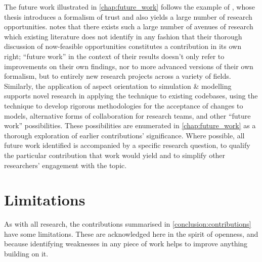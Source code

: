 \begin{description}[style=unboxed]
    The future work illustrated in \cref{chap:future_work} follows the example
    of \citet{marsh1994formalising}, whose thesis introduces a formalism of
    trust and also yields a large number of research opportunities.
    \citeauthor{marsh1994formalising} notes that there exists such a large
    number of avenues of research which existing literature does not identify in
    any fashion that their thorough discussion of now-feasible opportunities
    constitutes a contribution in its own right; ``future work'' in the context
    of their results doesn't only refer to improvements on their own findings,
    nor to more advanced versions of their own formalism, but to entirely new
    research projects across a variety of fields. Similarly, the application of
    aspect orientation to simulation \& modelling supports novel research in
    applying the technique to existing codebases, using the technique to develop
    rigorous methodologies for the acceptance of changes to models, alternative
    forms of collaboration for research teams, and other ``future work''
    possibilities. These possibilities are enumerated in \cref{chap:future_work}
    as a thorough exploration of earlier contributions' significance. Where
    possible, all future work identified is accompanied by a specific research
    question, to qualify the particular contribution that work would yield and
    to simplify other researchers' engagement with the topic.
\end{description}



\section{Limitations}

As with all research, the contributions summarised in
\cref{conclusion:contributions} have some limitations. These are acknowledged
here in the spirit of openness, and because identifying weaknesses in any piece
of work helps to improve anything building on it.

